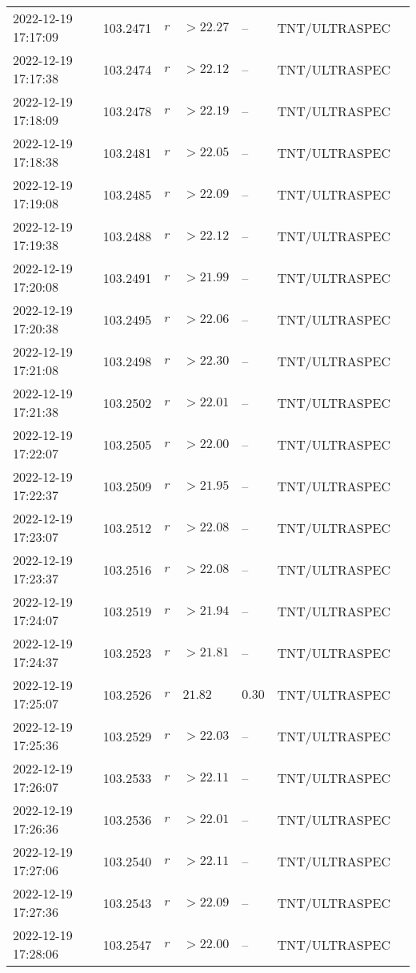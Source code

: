 \documentclass{nature_plusfigure}
\begin{document}
\begin{supplement}
\begin{center}
\begin{longtable}{lllllll}
2022-12-19 17:17:09 & 103.2471 & $r$ & $>22.27$ & -- & TNT/ULTRASPEC &  \\ 
2022-12-19 17:17:38 & 103.2474 & $r$ & $>22.12$ & -- & TNT/ULTRASPEC &  \\ 
2022-12-19 17:18:09 & 103.2478 & $r$ & $>22.19$ & -- & TNT/ULTRASPEC &  \\ 
2022-12-19 17:18:38 & 103.2481 & $r$ & $>22.05$ & -- & TNT/ULTRASPEC &  \\ 
2022-12-19 17:19:08 & 103.2485 & $r$ & $>22.09$ & -- & TNT/ULTRASPEC &  \\ 
2022-12-19 17:19:38 & 103.2488 & $r$ & $>22.12$ & -- & TNT/ULTRASPEC &  \\ 
2022-12-19 17:20:08 & 103.2491 & $r$ & $>21.99$ & -- & TNT/ULTRASPEC &  \\ 
2022-12-19 17:20:38 & 103.2495 & $r$ & $>22.06$ & -- & TNT/ULTRASPEC &  \\ 
2022-12-19 17:21:08 & 103.2498 & $r$ & $>22.30$ & -- & TNT/ULTRASPEC &  \\ 
2022-12-19 17:21:38 & 103.2502 & $r$ & $>22.01$ & -- & TNT/ULTRASPEC &  \\ 
2022-12-19 17:22:07 & 103.2505 & $r$ & $>22.00$ & -- & TNT/ULTRASPEC &  \\ 
2022-12-19 17:22:37 & 103.2509 & $r$ & $>21.95$ & -- & TNT/ULTRASPEC &  \\ 
2022-12-19 17:23:07 & 103.2512 & $r$ & $>22.08$ & -- & TNT/ULTRASPEC &  \\ 
2022-12-19 17:23:37 & 103.2516 & $r$ & $>22.08$ & -- & TNT/ULTRASPEC &  \\ 
2022-12-19 17:24:07 & 103.2519 & $r$ & $>21.94$ & -- & TNT/ULTRASPEC &  \\ 
2022-12-19 17:24:37 & 103.2523 & $r$ & $>21.81$ & -- & TNT/ULTRASPEC &  \\ 
2022-12-19 17:25:07 & 103.2526 & $r$ & $21.82$ & $0.30$ & TNT/ULTRASPEC &  \\ 
2022-12-19 17:25:36 & 103.2529 & $r$ & $>22.03$ & -- & TNT/ULTRASPEC &  \\ 
2022-12-19 17:26:07 & 103.2533 & $r$ & $>22.11$ & -- & TNT/ULTRASPEC &  \\ 
2022-12-19 17:26:36 & 103.2536 & $r$ & $>22.01$ & -- & TNT/ULTRASPEC &  \\ 
2022-12-19 17:27:06 & 103.2540 & $r$ & $>22.11$ & -- & TNT/ULTRASPEC &  \\ 
2022-12-19 17:27:36 & 103.2543 & $r$ & $>22.09$ & -- & TNT/ULTRASPEC &  \\ 
2022-12-19 17:28:06 & 103.2547 & $r$ & $>22.00$ & -- & TNT/ULTRASPEC &  \\ 

\end{longtable}
\end{center}
\end{supplement}
\end{document}
